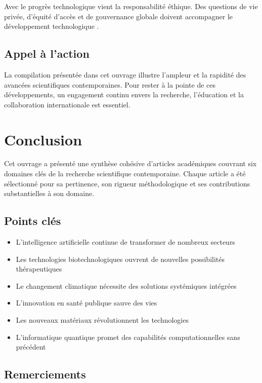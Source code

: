 \documentclass[12pt,a4paper,twoside,openright,openany]{book}
\begin{document}
	Avec le progrès technologique vient la responsabilité éthique. Des questions de vie privée, d'équité d'accès et de gouvernance globale doivent accompagner le développement technologique \cite{Bostrom2014}.
	
	\section{Appel à l'action}
	
	La compilation présentée dans cet ouvrage illustre l'ampleur et la rapidité des avancées scientifiques contemporaines. Pour rester à la pointe de ces développements, un engagement continu envers la recherche, l'éducation et la collaboration internationale est essentiel.
	
	\newpage
	
	\chapter*{Conclusion}
	
	Cet ouvrage a présenté une synthèse cohésive d'articles académiques couvrant six domaines clés de la recherche scientifique contemporaine. Chaque article a été sélectionné pour sa pertinence, son rigueur méthodologique et ses contributions substantielles à son domaine.
	
	\section*{Points clés}
	
	\begin{itemize}
		\item L'intelligence artificielle continue de transformer de nombreux secteurs
		\item Les technologies biotechnologiques ouvrent de nouvelles possibilités thérapeutiques
		\item Le changement climatique nécessite des solutions systémiques intégrées
		\item L'innovation en santé publique sauve des vies
		\item Les nouveaux matériaux révolutionnent les technologies
		\item L'informatique quantique promet des capabilités computationnelles sans précédent
	\end{itemize}
	
	\section*{Remerciements}
	
\end{document}
